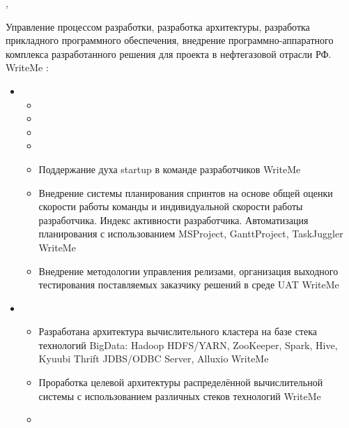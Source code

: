 \documentclass[11pt,a4paper,sans]{moderncv}        %
\begin{document}
{\protect{}}
{\cityspb, \country}
{}
{
	{Управление процессом разработки, разработка архитектуры, разработка прикладного программного обеспечения, внедрение программно-аппаратного комплекса разработанного решения для проекта в нефтегазовой отрасли РФ.}
	{WriteMe}
	\newline{}
	\achievements:
	\begin{itemize}
		\item {}
		\begin{itemize}
			\item {}
			\item {}
			\item {}
			\item {}
			\item {}
				{Поддержание духа startup в команде разработчиков}
				{WriteMe}
			\item {}
				{Внедрение системы планирования спринтов на основе общей оценки скорости работы команды и индивидуальной скорости работы разработчика. Индекс активности разработчика. Автоматизация планирования с использованием MSProject, GanttProject, TaskJuggler}
				{WriteMe}
			\item {}
				{Внедрение методологии управления релизами, организация выходного тестирования поставляемых заказчику решений в среде UAT}
				{WriteMe}
		\end{itemize}
		\item {}
		\begin{itemize}
			\item {}
				{Разработана архитектура вычислительного кластера на базе стека технологий BigData: Hadoop HDFS/YARN, ZooKeeper, Spark, Hive, Kyuubi Thrift JDBS/ODBC Server, Alluxio}
				{WriteMe}
			\item {}
				{Проработка целевой архитектуры распределённой вычислительной системы с использованием различных стеков технологий}
				{WriteMe}
			\item {}

\end{itemize}
\end{itemize}}
\end{document}
